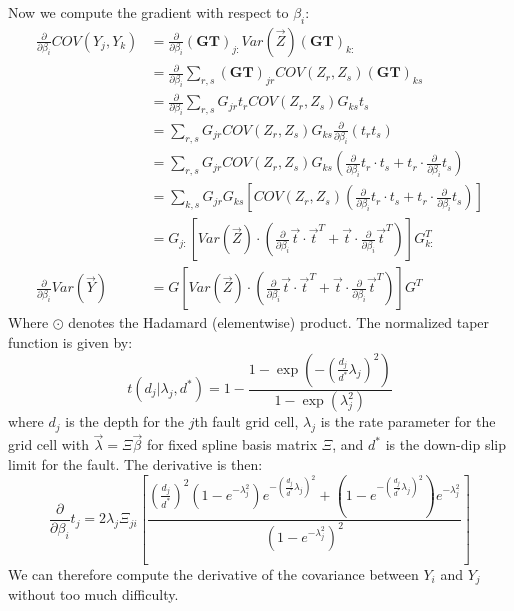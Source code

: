 {Now we compute the gradient with respect to $\beta_i$:
\begin{align*}
\frac{\partial}{\partial \beta_i} COV(Y_j, Y_k) &= \frac{\partial}{\partial \beta_i} (\mathbf{GT})_{j:} Var(\vec{Z}) (\mathbf{GT})_{k:} \\
&= \frac{\partial}{\partial \beta_i} \sum_{r,s} (\mathbf{GT})_{jr} COV(Z_r, Z_s) (\mathbf{GT})_{ks} \\
&= \frac{\partial}{\partial \beta_i} \sum_{r,s} G_{jr} t_r COV(Z_r, Z_s) G_{ks} t_s \\
&= \sum_{r,s} G_{jr} COV(Z_r, Z_s) G_{ks} \frac{\partial}{\partial \beta_i} (t_r t_s) \\
&= \sum_{r,s} G_{jr} COV(Z_r, Z_s) G_{ks} (\frac{\partial}{\partial \beta_i} t_r  \cdot t_s + t_r \cdot \frac{\partial}{\partial \beta_i} t_s) \\
&= \sum_{k,s} G_{jr} G_{ks} \left[COV(Z_r, Z_s) (\frac{\partial}{\partial \beta_i} t_r  \cdot t_s + t_r \cdot \frac{\partial}{\partial \beta_i} t_s) \right] \\
&= G_{j:} \left[ Var(\vec{Z}) \cdot (\frac{\partial}{\partial \beta_i} \vec{t} \cdot  \vec{t}^T + \vec{t} \cdot \frac{\partial}{\partial \beta_i} \vec{t}^T)\right] G_{k:}^T \\
\frac{\partial}{\partial \beta_i} Var(\vec{Y}) &= G \left[ Var(\vec{Z}) \cdot (\frac{\partial}{\partial \beta_i} \vec{t} \cdot \vec{t}^T + \vec{t} \cdot \frac{\partial}{\partial \beta_i} \vec{t}^T)\right] G^T
\end{align*}
Where $\odot$ denotes the Hadamard (elementwise) product.  The normalized taper function is given by:
$$ t(d_j \vert \lambda_j, d^*) = 1 - \frac{1 - \exp\left(-(\frac{d_j}{d^*}\lambda_j)^2 \right)}{1 - \exp(\lambda_j^2)} $$
where $d_j$ is the depth for the $j$th fault grid cell, $\lambda_j$ is the rate parameter for the grid cell with $\vec{\lambda} = \Xi \vec{\beta}$ for fixed spline basis matrix $\Xi$, and $d^*$ is the down-dip slip limit for the fault.  The derivative is then:
$$ \frac{\partial}{\partial \beta_i} t_j = 2 \lambda_j \Xi_{ji} \left[ \frac{(\frac{d_j}{d^*})^2(1 - e^{-\lambda_j^2})e^{-(\frac{d_j}{d^*}\lambda_j)^2} + (1 - e^{-(\frac{d_j}{d^*}\lambda_j)^2})e^{-\lambda_j^2}}{(1 - e^{-\lambda_j^2})^2} \right] $$
We can therefore compute the derivative of the covariance between $Y_i$ and $Y_j$ without too much difficulty.

}
